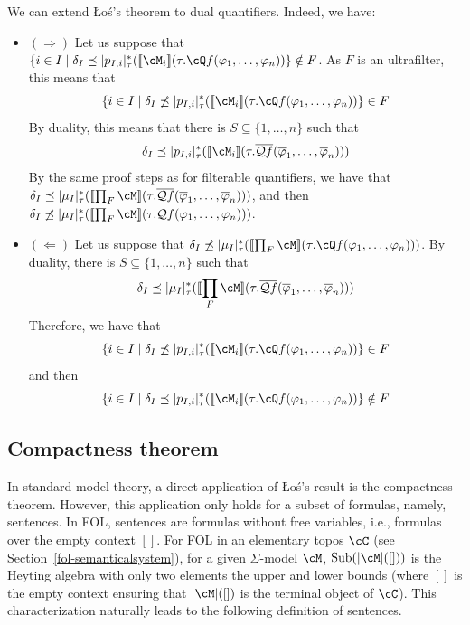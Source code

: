 \documentclass[preprint,3p,times]{elsarticle}
\newcommand{\Sub}{\mathrm{Sub}}
\def\sem#1{[\![ #1 ] \!]}
\newcommand{\Qf}{\mathcal{Q}f}
\newcommand{\Los}{\L{}o{\'s}}
\begin{document}
We can extend \Los's theorem to dual quantifiers. Indeed, we have:

\begin{itemize}
    \item $(\Rightarrow)$ Let us suppose that $\{i \in I \mid \delta_I \preceq |p_{I,i}|^*_\tau(\sem{\cM_i}(\tau.\cQ f(\varphi_1,\ldots,\varphi_n))\} \notin F$. As $F$ is an ultrafilter, this means that $$\{i \in I \mid \delta_I \not\preceq |p_{I,i}|^*_\tau(\sem{\cM_i}(\tau.\cQ f(\varphi_1,\ldots,\varphi_n))\} \in F$$ 
    By duality, this means that there is \(S \subseteq \{1,\ldots,n\}\) such that
    $$\delta_I \preceq |p_{I,i}|^*_\tau(\sem{\cM_i}(\tau.\overline{\Qf}(\overline{\varphi}_1,\ldots,\overline{\varphi}_n)))$$ 
    By the same proof steps as for filterable quantifiers, we have that $\delta_I \preceq |\mu_I|^*_\tau(\sem{\prod_F \cM}(\tau.\overline{\Qf}(\overline{\varphi}_1,\ldots,\overline{\varphi}_n)))$, and then $\delta_I \not\preceq |\mu_I|^*_\tau(\sem{\prod_F \cM}(\tau.\Qf(\varphi_1,\ldots,\varphi_n)))$.
    \item $(\Leftarrow)$ Let us suppose that $\delta_I \not\preceq |\mu_I|^*_\tau(\sem{\prod_F \cM}(\tau.\cQ f(\varphi_1,\ldots,\varphi_n)))$. By duality, there is \(S \subseteq \{1,\ldots,n\}\) such that
    $$\delta_I \preceq |\mu_I|^*_\tau(\sem{\prod_F \cM}(\tau.\overline{\Qf}(\overline{\varphi}_1,\ldots,\overline{\varphi}_n)))$$  
    Therefore, we have that 
    $$\{i \in I \mid \delta_I \not\preceq |p_{I,i}|^*_\tau(\sem{\cM_i}(\tau.\cQ f(\varphi_1,\ldots,\varphi_n))\} \in F$$
    and then
    $$\{i \in I \mid \delta_I \preceq |p_{I,i}|^*_\tau(\sem{\cM_i}(\tau.\cQ f(\varphi_1,\ldots,\varphi_n))\} \notin F$$
\end{itemize}

\subsection{Compactness theorem}
\label{subsec:los:compactness}

In standard model theory, a direct application of \Los's result is the compactness theorem. However, this application only holds for a subset of formulas, namely, sentences. In FOL, sentences are formulas without free variables, i.e., formulas over the empty context $[]$. For FOL in an elementary topos $\cC$ (see Section~\ref{fol-semanticalsystem}), for a given $\Sigma$-model $\cM$, $\Sub(|\cM|([]))$ is the Heyting algebra with only two elements the upper and lower bounds (where \([]\) is the empty context ensuring that \(|\cM|([])\) is the terminal object of \(\cC\)). This characterization naturally leads to the following definition of sentences.
\end{document}
